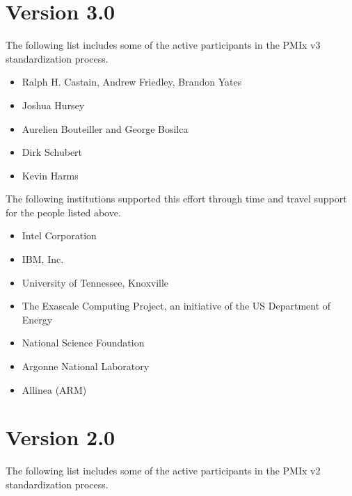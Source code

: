 \section{Version 3.0}

The following list includes some of the active participants in the PMIx v3 standardization process.

\begin{itemize}
\item Ralph H. Castain, Andrew Friedley, Brandon Yates
\item Joshua Hursey
\item Aurelien Bouteiller and George Bosilca
\item Dirk Schubert
\item Kevin Harms
\end{itemize}

The following institutions supported this effort through time and travel support for the people listed above.

\begin{itemize}
\item Intel Corporation
\item IBM, Inc.
\item University of Tennessee, Knoxville
\item The Exascale Computing Project, an initiative of the US Department of Energy
\item National Science Foundation
\item Argonne National Laboratory
\item Allinea (ARM)
\end{itemize}

\section{Version 2.0}

The following list includes some of the active participants in the PMIx v2 standardization process.

